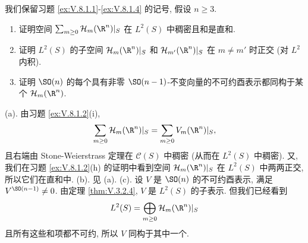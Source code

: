 \begin{exercise}[球函数]
\label{ex:V.8.1.5}
我们保留习题 \ref{ex:V.8.1.1}-\ref{ex:V.8.1.4} 的记号, 假设 $n \geq 3$.
\begin{enumerate}
\item[(a)] 证明空间 $\sum_{m \geq 0}\mathcal{H}_m(\R^n)|_S$ 在 $L^2(S)$ 中稠密且和是直和.
\item[(b)] 证明 $L^2(S)$ 的子空间 $\mathcal{H}_m(\R^n)|_S$ 和 $\mathcal{H}_{m'}(\R^n)|_S$ 在 $m \neq m'$ 时正交 (对 $L^2$ 内积).
\item[(c)] 证明 $\SO(n)$ 的每个具有非零 $\SO(n-1)$-不变向量的不可约酉表示都同构于某个 $\mathcal{H}_m(\R^n)$.
\end{enumerate}
\end{exercise}

\begin{solution}
(a). 由习题 \ref{ex:V.8.1.2}(i),
\[
\sum_{m \geq 0}\mathcal{H}_m(\R^n)|_S = \sum_{m \geq 0}V_m(\R^n)|_S,
\]
且右端由 Stone-Weierstrass 定理在 $\mathcal{C}(S)$ 中稠密 (从而在 $L^2(S)$ 中稠密). 又, 我们在习题 \ref{ex:V.8.1.2}(h) 的证明中看到空间 $\mathcal{H}_m(\R^n)|_S$ 在 $L^2(S)$ 中两两正交, 所以它们在直和中.
(b). 见 (a).
(c). 设 $V$ 是 $\SO(n)$ 的不可约酉表示, 满足 $V^{\SO(n-1)} \neq 0$. 由定理 \ref{thm:V.3.2.4}, $V$ 是 $L^2(S)$ 的子表示. 但我们已经看到
\[
L^2(S) = \bigoplus_{m \geq 0}\mathcal{H}_m(\R^n)|_S
\]
且所有这些和项都不可约, 所以 $V$ 同构于其中一个.
\end{solution}

